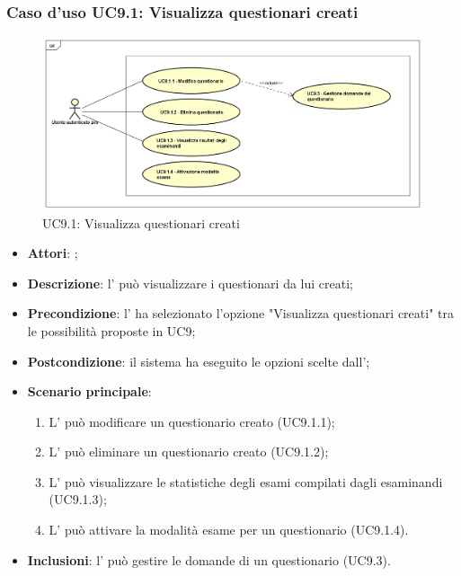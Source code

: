 		\subsubsection{Caso d'uso UC9.1: Visualizza questionari creati}
		\label{UC9.1}
		\begin{figure}[h]
			\centering
		\includegraphics[scale=0.5,keepaspectratio]{UML/UC9_1.png}
			\caption{UC9.1: Visualizza questionari creati}
		\end{figure}
		\FloatBarrier
		\begin{itemize}
			\item \textbf{Attori}: \uaupro{};
			\item \textbf{Descrizione}: l'\uaupro{} può visualizzare i questionari da lui creati;
			\item \textbf{Precondizione}: l'\uaupro{} ha selezionato l'opzione "Visualizza questionari creati" tra le possibilità proposte in UC9;
			\item \textbf{Postcondizione}: il sistema ha eseguito le opzioni scelte dall'\uaupro{};
			\item \textbf{Scenario principale}: 
				\begin{enumerate}
					\item L'\uaupro{} può modificare un questionario creato (UC9.1.1);
					\item L'\uaupro{} può eliminare un questionario creato (UC9.1.2);
					\item L'\uaupro{} può visualizzare le statistiche degli esami compilati dagli esaminandi (UC9.1.3);
					\item L'\uaupro{} può attivare la modalità esame per un questionario (UC9.1.4).
				\end{enumerate}
				\item \textbf{Inclusioni}: l'\uaupro{} può gestire le domande di un questionario (UC9.3).
		\end{itemize}
		
